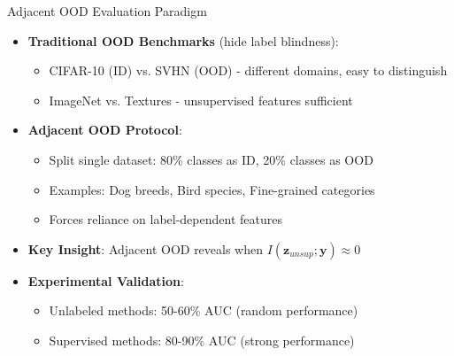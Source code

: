 \documentclass[aspectratio=169]{beamer}
\begin{document}
\begin{frame}{Adjacent OOD Evaluation Paradigm}
\begin{itemize}
    \item \textbf{Traditional OOD Benchmarks} (hide label blindness):
    \begin{itemize}
        \item CIFAR-10 (ID) vs. SVHN (OOD) - different domains, easy to distinguish
        \item ImageNet vs. Textures - unsupervised features sufficient
    \end{itemize}
    \item \textbf{Adjacent OOD Protocol}:
    \begin{itemize}
        \item Split single dataset: 80\% classes as ID, 20\% classes as OOD
        \item Examples: Dog breeds, Bird species, Fine-grained categories
        \item Forces reliance on label-dependent features
    \end{itemize}
    \item \textbf{Key Insight}: Adjacent OOD reveals when $I(\mathbf{z}_{unsup}; \mathbf{y}) \approx 0$
    \item \textbf{Experimental Validation}:
    \begin{itemize}
        \item Unlabeled methods: 50-60\% AUC (random performance)
        \item Supervised methods: 80-90\% AUC (strong performance)
    \end{itemize}
\end{itemize}
\end{frame}
\end{document}
